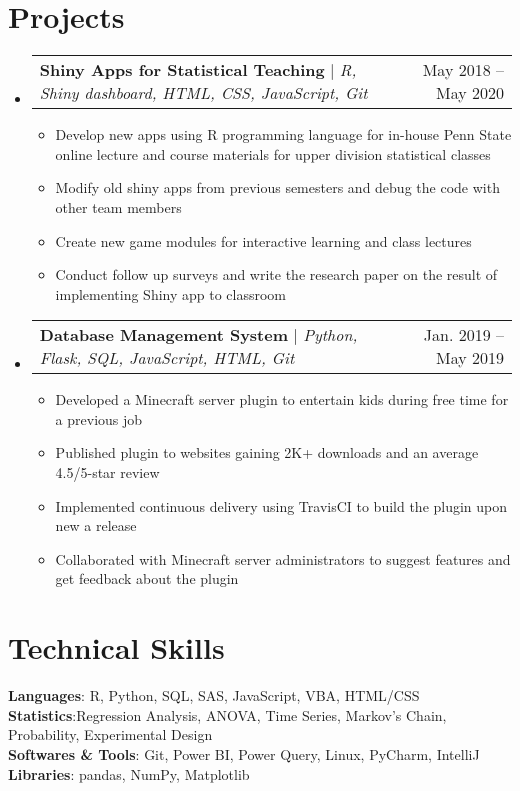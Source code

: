 \documentclass[letterpaper,11pt]{article}
\makeatletter
\newcommand{\resumeItem}[1]{
  \item\small{
    {#1 \vspace{-2pt}}
  }
}
\newcommand{\resumeProjectHeading}[2]{
    \item
    \begin{tabular*}{0.97\textwidth}{l@{\extracolsep{\fill}}r}
      \small#1 & #2 \\
    \end{tabular*}\vspace{-7pt}
}
\newcommand{\resumeSubHeadingListStart}{\begin{itemize}[leftmargin=0.15in, label={}]}
\newcommand{\resumeSubHeadingListEnd}{\end{itemize}}
\newcommand{\resumeItemListStart}{\begin{itemize}}
\newcommand{\resumeItemListEnd}{\end{itemize}\vspace{-5pt}}
\makeatother
\begin{document}
\section{Projects}
    \resumeSubHeadingListStart
      \resumeProjectHeading
          {\textbf{Shiny Apps for Statistical Teaching} $|$ \emph{R, Shiny dashboard, HTML, CSS, JavaScript, Git}}{May 2018 -- May 2020}
          \resumeItemListStart
            \resumeItem{Develop new apps using R programming language for in-house Penn State online lecture and course materials for upper division statistical classes}
            \resumeItem{Modify old shiny apps from previous semesters and debug the code with other team members }
            \resumeItem{Create new game modules for interactive learning and class lectures}
            \resumeItem{Conduct follow up surveys and write the research paper on the result of implementing Shiny app to classroom}
          \resumeItemListEnd
      \resumeProjectHeading
          {\textbf{Database Management System} $|$ \emph{Python, Flask, SQL, JavaScript, HTML, Git}}{Jan. 2019 -- May 2019}
          \resumeItemListStart
            \resumeItem{Developed a Minecraft server plugin to entertain kids during free time for a previous job}
            \resumeItem{Published plugin to websites gaining 2K+ downloads and an average 4.5/5-star review}
            \resumeItem{Implemented continuous delivery using TravisCI to build the plugin upon new a release}
            \resumeItem{Collaborated with Minecraft server administrators to suggest features and get feedback about the plugin}
          \resumeItemListEnd
    \resumeSubHeadingListEnd



%
\section{Technical Skills}
 \begin{itemize}[leftmargin=0.15in, label={}]
    \small{\item{
     \textbf{Languages}{: R, Python, SQL, SAS, JavaScript, VBA, HTML/CSS} \\
     \textbf{Statistics}{:Regression Analysis, ANOVA, Time Series, Markov's Chain, Probability, Experimental Design} \\
     \textbf{Softwares \& Tools}{: Git, Power BI, Power Query, Linux, PyCharm, IntelliJ} \\
     \textbf{Libraries}{: pandas, NumPy, Matplotlib}
    }}
 \end{itemize}


\end{document}
